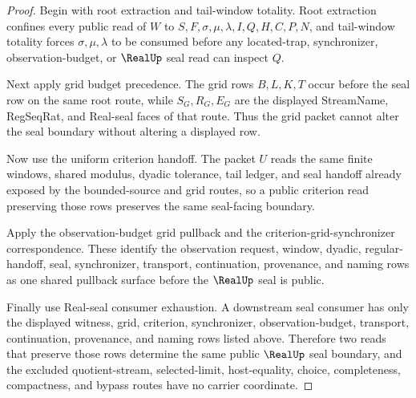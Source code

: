 \begin{proof}
Begin with root extraction and tail-window totality. Root extraction confines every public read of $W$ to $S,F,\sigma,\mu,\lambda,I,Q,H,C,P,N$, and tail-window totality forces $\sigma,\mu,\lambda$ to be consumed before any located-trap, synchronizer, observation-budget, or $\RealUp$ seal read can inspect $Q$.

Next apply grid budget precedence. The grid rows $B,L,K,T$ occur before the seal row on the same root route, while $S_G,R_G,E_G$ are the displayed StreamName, RegSeqRat, and Real-seal faces of that route. Thus the grid packet cannot alter the seal boundary without altering a displayed row.

Now use the uniform criterion handoff. The packet $U$ reads the same finite windows, shared modulus, dyadic tolerance, tail ledger, and seal handoff already exposed by the bounded-source and grid routes, so a public criterion read preserving those rows preserves the same seal-facing boundary.

Apply the observation-budget grid pullback and the criterion-grid-synchronizer correspondence. These identify the observation request, window, dyadic, regular-handoff, seal, synchronizer, transport, continuation, provenance, and naming rows as one shared pullback surface before the $\RealUp$ seal is public.

Finally use Real-seal consumer exhaustion. A downstream seal consumer has only the displayed witness, grid, criterion, synchronizer, observation-budget, transport, continuation, provenance, and naming rows listed above. Therefore two reads that preserve those rows determine the same public $\RealUp$ seal boundary, and the excluded quotient-stream, selected-limit, host-equality, choice, completeness, compactness, and bypass routes have no carrier coordinate.
\end{proof}

